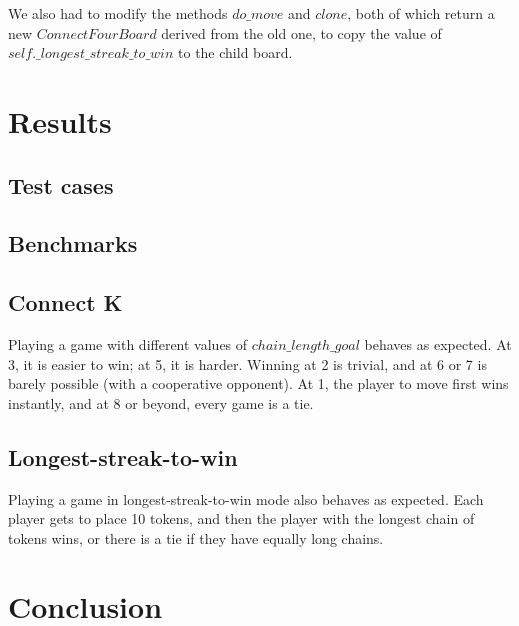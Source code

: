 \documentclass[11pt]{article}
\begin{document}
We also had to modify the methods \(do\_move\) and \(clone\), both of which
return a new \(ConnectFourBoard\) derived from the old one, to copy the value
of \(self.\_longest\_streak\_to\_win\) to the child board.

\section{Results}

\subsection{Test cases}

\subsection{Benchmarks}

\subsection{Connect K}

Playing a game with different values of \(chain\_length\_goal\) behaves as
expected. At 3, it is easier to win; at 5, it is harder. Winning at 2 is
trivial, and at 6 or 7 is barely possible (with a cooperative opponent).
At 1, the player to move first wins instantly, and at 8 or beyond, every game
is a tie.

\subsection{Longest-streak-to-win}

Playing a game in longest-streak-to-win mode also behaves as expected. Each
player gets to place 10 tokens, and then the player with the longest chain
of tokens wins, or there is a tie if they have equally long chains.

\section{Conclusion}
\end{document}
